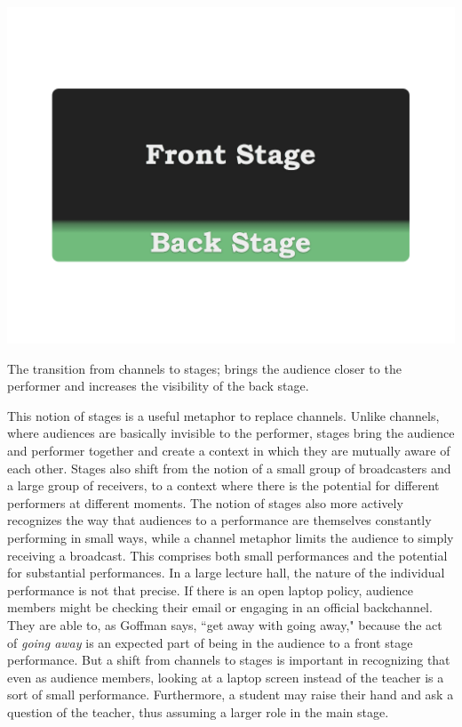 \begin{marginfigure}[-1.0in]
	\includegraphics{figures/front-stage-back-stage.png}
	\caption{The transition from channels to stages; brings the audience closer to the performer and increases the visibility of the back stage.}
	\label{fig:front-back-stage}
\end{marginfigure}

This notion of stages is a useful metaphor to replace channels. Unlike channels, where audiences are basically invisible to the performer, stages bring the audience and performer together and create a context in which they are mutually aware of each other. Stages also shift from the notion of a small group of broadcasters and a large group of receivers, to a context where there is the potential for different performers at different moments. The notion of stages also more actively recognizes the way that audiences to a performance are themselves constantly performing in small ways, while a channel metaphor limits the audience to simply receiving a broadcast. This comprises both small performances and the potential for substantial performances. In a large lecture hall, the nature of the individual performance is not that precise. If there is an open laptop policy, audience members might be checking their email or engaging in an official backchannel.  They are able to, as Goffman says, ``get away with going away," because the act of \emph{going away} is an expected part of being in the audience to a front stage performance. But a shift from channels to stages is important in recognizing that even as audience members, looking at a laptop screen instead of the teacher is a sort of small performance. Furthermore, a student may raise their hand and ask a question of the teacher, thus assuming a larger role in the main stage.

